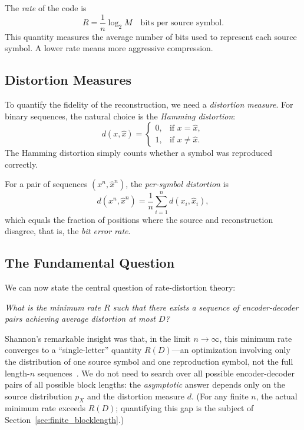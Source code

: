 \documentclass[11pt]{article}
\begin{document}
The \emph{rate} of the code is
\begin{equation}
\label{eq:rate_def}
R = \frac{1}{n} \log_2 M \quad \text{bits per source symbol}.
\end{equation}
This quantity measures the average number of bits used to represent each source
symbol.
A lower rate means more aggressive compression.

\subsection{Distortion Measures}
\label{subsec:distortion}

To quantify the fidelity of the reconstruction, we need a \emph{distortion measure}.
For binary sequences, the natural choice is the \emph{Hamming distortion}:
\begin{equation}
\label{eq:hamming}
d(x, \hat{x}) =
\begin{cases}
0, & \text{if } x = \hat{x}, \\
1, & \text{if } x \neq \hat{x}.
\end{cases}
\end{equation}
The Hamming distortion simply counts whether a symbol was reproduced correctly.

For a pair of sequences $(x^n, \hat{x}^n)$, the \emph{per-symbol distortion} is
\begin{equation}
\label{eq:block_distortion}
d(x^n, \hat{x}^n) = \frac{1}{n} \sum_{i=1}^{n} d(x_i, \hat{x}_i),
\end{equation}
which equals the fraction of positions where the source and reconstruction
disagree, that is, the \emph{bit error rate}.

\subsection{The Fundamental Question}
\label{subsec:fundamental}

We can now state the central question of rate-distortion theory:

\medskip
\noindent\emph{What is the minimum rate $R$ such that there exists a sequence of
encoder-decoder pairs achieving average distortion at most $D$?}
\medskip

Shannon's remarkable insight was that, in the limit $n \to \infty$, this minimum
rate converges to a ``single-letter'' quantity $R(D)$---an optimization involving
only the distribution of one source symbol and one reproduction symbol, not the
full length-$n$ sequences~\cite{shannon1959}.
We do not need to search over all possible encoder-decoder pairs of all possible
block lengths: the \emph{asymptotic} answer depends only on the source
distribution $p_X$ and the distortion measure $d$.
(For any finite $n$, the actual minimum rate exceeds $R(D)$; quantifying this
gap is the subject of Section~\ref{sec:finite_blocklength}.)
\end{document}

